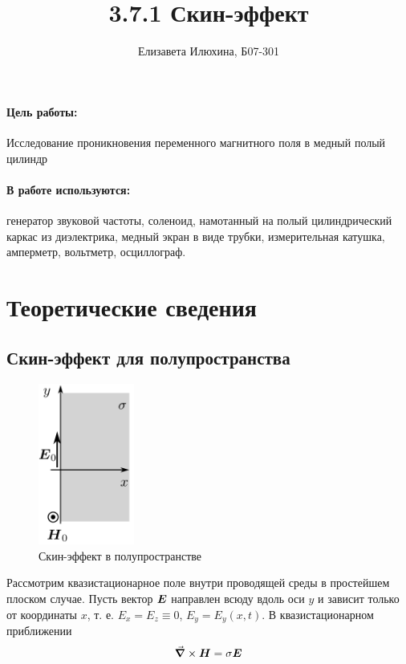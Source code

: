 \documentclass[a4paper,12pt]{article}
\author{Елизавета Илюхина, Б07-301}
\title{3.7.1 Скин-эффект}
\date{}
\theoremstyle{plain} %
\theoremstyle{definition} %
\theoremstyle{remark} %
\begin{document}
	\maketitle
	\paragraph{Цель работы:}  Исследование проникновения переменного магнитного поля в медный полый цилиндр
		\paragraph{В работе используются:} генератор звуковой частоты, соленоид, намотанный на полый цилиндрический каркас из диэлектрика, медный экран в виде трубки, измерительная катушка, амперметр, вольтметр, осциллограф.
		
	\section{Теоретические сведения}
	\subsection{Скин-эффект для полупространства}
		\begin{figure}
	\begin{center}
			\includegraphics[width=0.28\textwidth]{poluprostranstvo}
		\end{center}
	\caption{Скин-эффект в полупространстве}\label{fig:poluprostranstvo}
	\end{figure}
	
	Рассмотрим квазистационарное поле внутри проводящей среды в простейшем плоском случае.
	Пусть вектор $\vb*{E}$ направлен всюду вдоль оси $y$ и зависит только от координаты $x$, т. е. ${E_x} = {E_z} \equiv 0$, $E_y=E_y(x,t)$.
	В квазистационарном приближении 
	\begin{equation*}
		\grad \times \vb*{H} = \sigma \vb*{E}
	\end{equation*}
	
\end{document}
